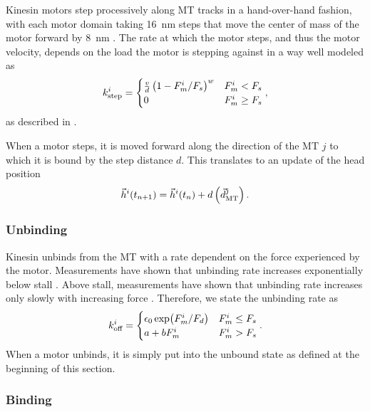 Kinesin motors step processively along MT tracks in a hand-over-hand fashion, with each motor domain taking \SI{16}{\nano\meter} steps \cite{Yildiz2004} that move the center of mass of the motor forward by \SI{8}{\nano\meter} \cite{Svoboda1993}. The rate at which the motor steps, and thus the motor velocity, depends on the load the motor is stepping against in a way well modeled as 
\begin{equation} \label{eq:stepping}
k_\text{step}^i = 
\begin{cases}
\frac{v}{d}\left(1-F_m^i/F_s \right)^w & F_m^i < F_s \\
0 & F_m^i \geq F_s
\end{cases},
\end{equation}
as described in \cite{Kunwar2010}.

When a motor steps, it is moved forward along the direction of the MT $j$ to which it is bound by the step distance $d$. This translates to an update of the head position 
\begin{equation} \label{eq:step_head}
\vec{h}^i(t_{n+1}) = \vec{h}^i(t_n) + d \left(\vec{d}_\text{MT}^j \right).
\end{equation}

\subsubsection*{Unbinding}

Kinesin unbinds from the MT with a rate dependent on the force experienced by the motor. Measurements have shown that unbinding rate increases exponentially below stall \cite{Milic2014}. Above stall, measurements have shown that unbinding rate increases only slowly with increasing force \cite{Kunwar2011}. Therefore, we state the unbinding rate as
\begin{equation} \label{eq:unbinding}
k_\text{off}^i = 
\begin{cases}
\epsilon_0 \exp(F_m^i/F_d) & F_m^i \leq F_s \\
a+b F_m^i & F_m^i>F_s
\end{cases}.
\end{equation}
When a motor unbinds, it is simply put into the unbound state as defined at the beginning of this section.

\subsubsection*{Binding}

